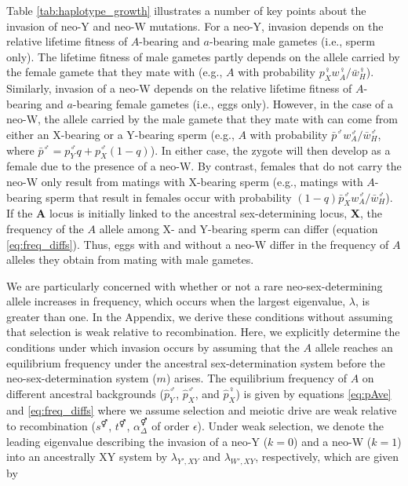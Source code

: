 \documentclass[12pt]{article}
\begin{document}
Table \ref{tab:haplotype_growth} illustrates a number of key points about the invasion of neo-Y and neo-W mutations. 
For a neo-Y, invasion depends on the relative lifetime fitness of $A$-bearing and $a$-bearing male gametes (i.e., sperm only).
The lifetime fitness of male gametes partly depends on the allele carried by the female gamete that they mate with (e.g., $A$ with probability $p_{X}^{\female} w_{A}^{\female}/\bar{w}_{H}^{\female}$).
Similarly, invasion of a neo-W depends on the relative lifetime fitness of $A$-bearing and $a$-bearing female gametes (i.e., eggs only). 
However, in the case of a neo-W, the allele carried by the male gamete that they mate with can come from either an X-bearing or a Y-bearing sperm (e.g., $A$ with probability $\bar{p}^{\male} w_{A}^{\male}/\bar{w}_{H}^{\male}$, where $\bar{p}^{\male}=p_{Y}^{\male}q+p_{X}^{\male}(1-q)$). 
In either case, the zygote will then develop as a female due to the presence of a neo-W. 
By contrast, females that do not carry the neo-W only result from matings with X-bearing sperm (e.g., matings with $A$-bearing sperm that result in females occur with probability $(1-q)\bar{p}_{X}^{\male} w_{A}^{\male}/\bar{w}_{H}^{\male}$). 
If the \textbf{A} locus is initially linked to the ancestral sex-determining locus, \textbf{X}, the frequency of the $A$ allele among X- and Y-bearing sperm can differ (equation \ref{eq:freq_diffs}). 
Thus, eggs with and without a neo-W differ in the frequency of $A$ alleles they obtain from mating with male gametes. 

We are particularly concerned with whether or not a rare neo-sex-determining allele increases in frequency, which occurs when the largest eigenvalue, $\lambda$, is greater than one. 
In the Appendix, we derive these conditions without assuming that selection is weak relative to recombination. 
Here, we explicitly determine the conditions under which invasion occurs by assuming that the $A$ allele reaches an equilibrium frequency under the ancestral sex-determination system before the neo-sex-determination system ($m$) arises. 
The equilibrium  frequency of $A$ on different ancestral backgrounds ($\hat{p}^\male_Y$, $\hat{p}^\male_X$, and $\hat{p}^\female_X$) is given by equations \eqref{eq:pAve} and \eqref{eq:freq_diffs} where we assume selection and meiotic drive are weak relative to recombination ($s^\Hermaphrodite$, $t^\Hermaphrodite$, $\alpha_{\Delta}^\Hermaphrodite$ of order $\epsilon$). 
Under weak selection, we denote the leading eigenvalue describing the invasion of a neo-Y ($k=0$) and a neo-W ($k=1$) into an ancestrally XY system by $\lambda_{Y',XY}$ and $\lambda_{W',XY}$, respectively, which are given by
\end{document}
